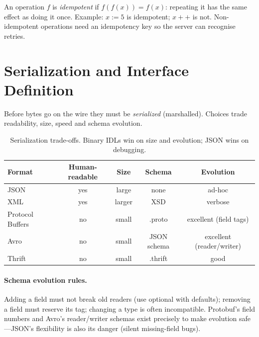 \begin{definition}[Idempotency]
An operation $f$ is \emph{idempotent} if $f(f(x))=f(x)$: repeating it has the same effect as doing it once. Example: $x:=5$ is idempotent; $x{+}{+}$ is not. Non-idempotent operations need an idempotency key so the server can recognise retries.
\end{definition}

\section{Serialization and Interface Definition}
\label{sec:serial}
Before bytes go on the wire they must be \emph{serialized} (marshalled). Choices trade readability, size, speed and schema evolution.

\begin{table}[h]
\centering\small
\begin{tabular}{lcccc}
\toprule
Format & Human-readable & Size & Schema & Evolution \\
\midrule
JSON & yes & large & none & ad-hoc \\
XML & yes & larger & XSD & verbose \\
Protocol Buffers & no & small & .proto & excellent (field tags) \\
Avro & no & small & JSON schema & excellent (reader/writer) \\
Thrift & no & small & .thrift & good \\
\bottomrule
\end{tabular}
\caption{Serialization trade-offs. Binary IDLs win on size and evolution; JSON wins on debugging.}
\label{tab:serial}
\end{table}

\paragraph{Schema evolution rules.} Adding a field must not break old readers (use optional with defaults); removing a field must reserve its tag; changing a type is often incompatible. Protobuf's field numbers and Avro's reader/writer schemas exist precisely to make evolution safe---JSON's flexibility is also its danger (silent missing-field bugs).

